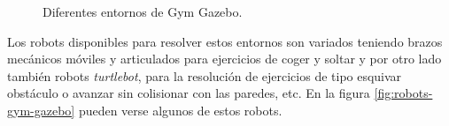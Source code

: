 \begin{figure}
  \begin{center}
    \hspace{0.1cm}
  \end{center}
  \centering
  \captionsetup{justification=centering,margin=2cm}
  \caption{Diferentes entornos de Gym Gazebo.}
  \label{fig:mundos-gym-gazebo}
\end{figure}

Los robots disponibles para resolver estos entornos son variados teniendo brazos mecánicos móviles y articulados para ejercicios de coger y soltar y por otro lado también robots \textit{turtlebot}, para la resolución de ejercicios de tipo esquivar obstáculo o avanzar sin colisionar con las paredes, etc. En la figura \ref{fig:robots-gym-gazebo} pueden verse algunos de estos robots.

